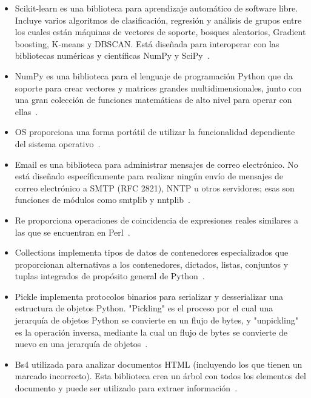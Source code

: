 \documentclass[conference,a4paper]{IEEEtran}
\begin{document}
\begin{itemize}
\item Scikit-learn es una biblioteca para aprendizaje automático de software libre. Incluye varios algoritmos de clasificación, regresión y análisis de grupos entre los cuales están máquinas de vectores de soporte, bosques aleatorios, Gradient boosting, K-means y DBSCAN. Está diseñada para interoperar con las bibliotecas numéricas y científicas NumPy y SciPy~\cite{b12}.

\item  NumPy es una biblioteca para el lenguaje de programación Python que da soporte para crear vectores y matrices grandes multidimensionales, junto con una gran colección de funciones matemáticas de alto nivel para operar con ellas~\cite{b13}.

\item OS proporciona una forma portátil de utilizar la funcionalidad dependiente del sistema operativo~\cite{b14}.

\item Email es una biblioteca para administrar mensajes de correo electrónico. No está diseñado específicamente para realizar ningún envío de mensajes de correo electrónico a SMTP (RFC 2821), NNTP u otros servidores; esas son funciones de módulos como smtplib y nntplib~\cite{b15}.

\item Re proporciona operaciones de coincidencia de expresiones reales similares a las que se encuentran en Perl~\cite{b16}.

\item Collections  implementa tipos de datos de contenedores especializados que proporcionan alternativas a los contenedores, dictados, listas, conjuntos y tuplas integrados de propósito general de Python~\cite{b17}.

\item Pickle implementa protocolos binarios para serializar y desserializar una estructura de objetos Python. "Pickling" es el proceso por el cual una jerarquía de objetos Python se convierte en un flujo de bytes, y "unpickling" es la operación inversa, mediante la cual un flujo de bytes se convierte de nuevo en una jerarquía de objetos~\cite{b18}.

\item Bs4 utilizada para analizar documentos HTML (incluyendo los que tienen un marcado incorrecto). Esta biblioteca crea un árbol con todos los elementos del documento y puede ser utilizado para extraer información~\cite{b19}.


\end{itemize}
\end{document}
